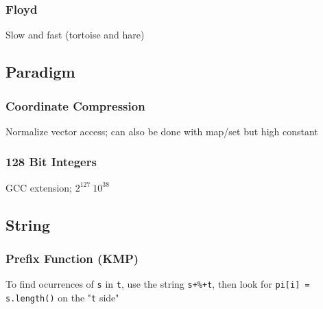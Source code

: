 \documentclass[12pt, a4paper, twoside]{article}
\begin{document}
\subsubsection{Floyd}
Slow and fast (tortoise and hare)

\subsection{Paradigm}
\subsubsection{Coordinate Compression}
Normalize vector access; can also be done with map/set but high constant

\subsubsection{128 Bit Integers}
GCC extension; $2^{127} ~ 10^{38}$

\subsection{String}
\subsubsection{Prefix Function (KMP)}
To find ocurrences of \texttt{s} in \texttt{t}, use the string \texttt{s+\%+t}, then look for \texttt{pi[i] = s.length()} on the "\texttt{t} side"
\end{document}
